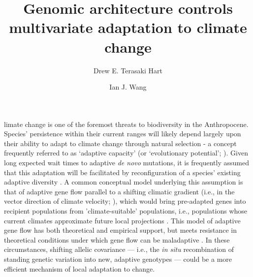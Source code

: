 \documentclass[9pt,twocolumn,twoside,lineno]{pnas-new}
\title{Genomic architecture controls multivariate adaptation to climate change}
\author[a,1]{Drew E. Terasaki Hart}
\author[a]{Ian J. Wang}
\affil[a]{Department of Environmental Science, Policy, and Management, University of California, Berkeley, CA 94720}
\begin{document}
\maketitle
\thispagestyle{firststyle}


limate change is one of the foremost threats to biodiversity in the Anthropocene.
Species’ persistence within their current ranges will likely depend largely upon their ability to
adapt to climate change through natural selection - a concept frequently referred to 
as `adaptive capacity’ (or `evolutionary potential’;
\cite{chevin,harrisson,nicotra,vilas,wade}).
Given long expected wait times to adaptive \textit{de novo} mutations,
it is frequently assumed that this adaptation will be facilitated
by reconfiguration of a species' existing adaptive diversity \cite{bomblies}.
A common conceptual model underlying this assumption is that of
adaptive gene flow parallel to a shifting climatic gradient
(i.e., in the vector
direction of climate velocity; \cite{ackerly}),
which would bring pre-adapted genes into recipient populations
from 'climate-suitable' populations, i.e., populations whose
current climates approximate future local projections \cite{bellis}.
This model of adaptive gene flow has both theoretical
\cite{aitken_whitlock,slatkin,tigano}
and empirical 
\cite{feder,bell}
support,
but meets resistance in theoretical conditions under which gene flow can be maladaptive
\cite{wang,lenormand,slatkin,haldane,wright,felsenstein}.
In these circumstances, shifting allelic covariance --- 
i.e., the \textit{in situ} recombination of standing genetic variation into new,
adaptive genotypes --- could be a more efficient mechanism of local adaptation to change.
\end{document}
